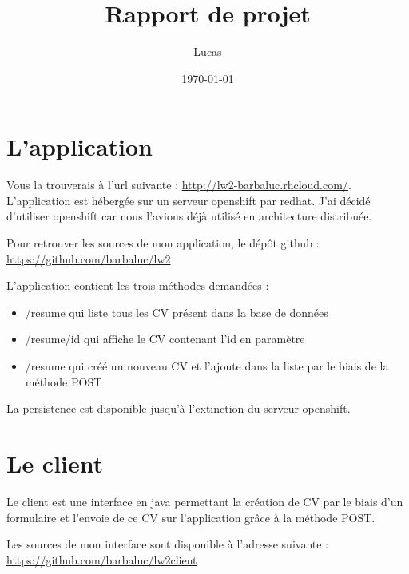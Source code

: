 \documentclass{univ-projet}
\title{Rapport de projet}
\author{Lucas \bsc{Barbay}}
\date{\today}
\theoremstyle{definition}
\begin{document}
 

\maketitle
\newpage
\tableofcontents
\newpage

\section{L'application}

Vous la trouverais à l'url suivante : \url{http://lw2-barbaluc.rhcloud.com/}. L'application est hébergée sur un serveur openshift par redhat. J'ai décidé d'utiliser openshift car nous l'avions déjà utilisé en architecture distribuée.

Pour retrouver les sources de mon application, le dépôt github : \url{https://github.com/barbaluc/lw2}

L'application contient les trois méthodes demandées : 

\begin{itemize}
\item /resume qui liste tous les CV présent dans la base de données
\item /resume/id qui affiche le CV contenant l'id en paramètre
\item /resume qui créé un nouveau CV et l'ajoute dans la liste par le biais de la méthode POST
\end{itemize}

La persistence est disponible jusqu'à l'extinction du serveur openshift.


\section{Le client}

Le client est une interface en java permettant la création de CV par le biais d'un formulaire et l'envoie de ce CV sur l'application grâce à la méthode POST.

Les sources de mon interface sont disponible à l'adresse suivante : \url{https://github.com/barbaluc/lw2client}
\end{document}
